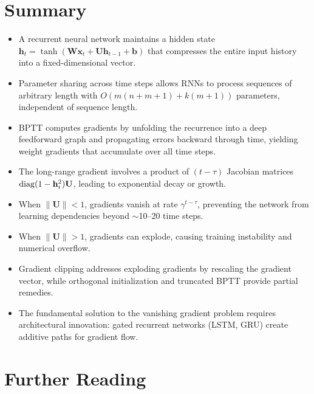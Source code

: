 \documentclass[11pt,a4paper]{article}
\begin{document}
\section{Summary}
\label{sec:summary}

\begin{itemize}
  \item A recurrent neural network maintains a hidden state
    $\mathbf{h}_t = \tanh(\mathbf{W}\mathbf{x}_t +
    \mathbf{U}\mathbf{h}_{t-1} + \mathbf{b})$ that compresses the
    entire input history into a fixed-dimensional vector.
  \item Parameter sharing across time steps allows RNNs to process
    sequences of arbitrary length with $O(m(n + m + 1) + k(m+1))$
    parameters, independent of sequence length.
  \item BPTT computes gradients by unfolding the recurrence into a
    deep feedforward graph and propagating errors backward through
    time, yielding weight gradients that accumulate over all time
    steps.
  \item The long-range gradient involves a product of $(t - \tau)$
    Jacobian matrices $\operatorname{diag}(1 - \mathbf{h}_i^2)\mathbf{U}$,
    leading to exponential decay or growth.
  \item When $\|\mathbf{U}\| < 1$, gradients vanish at rate
    $\gamma^{t-\tau}$, preventing the network from learning
    dependencies beyond $\sim$10--20 time steps.
  \item When $\|\mathbf{U}\| > 1$, gradients can explode, causing
    training instability and numerical overflow.
  \item Gradient clipping addresses exploding gradients by rescaling
    the gradient vector, while orthogonal initialization and
    truncated BPTT provide partial remedies.
  \item The fundamental solution to the vanishing gradient problem
    requires architectural innovation: gated recurrent networks
    (LSTM, GRU) create additive paths for gradient flow.
\end{itemize}

\section{Further Reading}
\label{sec:further-reading}
\end{document}
